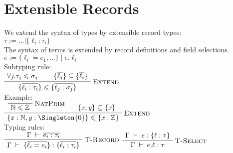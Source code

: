 \chapter{Extensible Records}
\label{ch:records}


We extend the syntax of types by extensible record types:\cite{leijen2005extensible} \\
$ \tau := \dots | \{ \ell_i : \tau_i \} $ \\

The syntax of terms is extended by record definitions and field selections. \\
$ e := \{ \ell_i = e_1, \dots \} \; | \; e.\ell_i $ \\


Subtyping rule: \\
$
\AxiomC{$\forall j. \tau_j \sub \sigma_j$}
\AxiomC{$\{ \overline{\ell_j} \} \subseteq \{ \overline{\ell_i} \}$}
\RightLabel{\textsc{Extend}}
\BinaryInfC{$\{ \overline{\ell_i : \tau_i} \} \sub \{ \overline{\ell_j : \sigma_j} \}$}
\DisplayProof
$
\\

Example: \\
$
\AxiomC{}
\RightLabel{\textsc{NatPrim}}
\UnaryInfC{$\Nat \sub \Int$}
\AxiomC{$\{ \mathit{x}, \mathit{y} \} \subseteq \{ \mathit{x} \}$}
\RightLabel{\textsc{Extend}}
\BinaryInfC{$\{ \mathit{x} : \Nat, \mathit{y} : \Singleton{0} \} \sub \{ \mathit{x} : \Int \}$}
\DisplayProof
$
\\

Typing rules: \\
$
\AxiomC{$\ctx \overline{e_i : \tau_i}$}
\RightLabel{\textsc{T-Record}}
\UnaryInfC{$ \ctx \{ \overline{\ell_i = e_i} \} : \{ \overline{\ell_i : \tau_i} \}$}
\DisplayProof
$
$
\AxiomC{$ \ctx e : \{ \ell : \tau \}$}
\RightLabel{\textsc{T-Select}}
\UnaryInfC{$ \ctx e.\ell : \tau$}
\DisplayProof
$